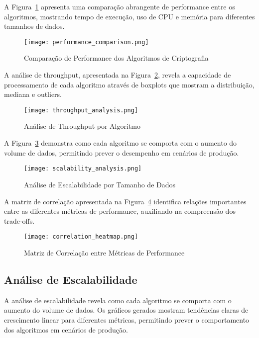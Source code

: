 \documentclass[12pt,a4paper,oneside]{article}
\begin{document}
A Figura~\ref{fig:performance} apresenta uma comparação abrangente de performance entre os algoritmos, mostrando tempo de execução, uso de CPU e memória para diferentes tamanhos de dados.

\begin{figure}[H]
\centering
\texttt{[image: performance\_comparison.png]}
\caption{Comparação de Performance dos Algoritmos de Criptografia}
\label{fig:performance}
\end{figure}

A análise de throughput, apresentada na Figura~\ref{fig:throughput}, revela a capacidade de processamento de cada algoritmo através de boxplots que mostram a distribuição, mediana e outliers.

\begin{figure}[H]
\centering
\texttt{[image: throughput\_analysis.png]}
\caption{Análise de Throughput por Algoritmo}
\label{fig:throughput}
\end{figure}

A Figura~\ref{fig:scalability} demonstra como cada algoritmo se comporta com o aumento do volume de dados, permitindo prever o desempenho em cenários de produção.

\begin{figure}[H]
\centering
\texttt{[image: scalability\_analysis.png]}
\caption{Análise de Escalabilidade por Tamanho de Dados}
\label{fig:scalability}
\end{figure}

A matriz de correlação apresentada na Figura~\ref{fig:correlation} identifica relações importantes entre as diferentes métricas de performance, auxiliando na compreensão dos trade-offs.

\begin{figure}[H]
\centering
\texttt{[image: correlation\_heatmap.png]}
\caption{Matriz de Correlação entre Métricas de Performance}
\label{fig:correlation}
\end{figure}

\subsection{Análise de Escalabilidade}

A análise de escalabilidade revela como cada algoritmo se comporta com o aumento do volume de dados. Os gráficos gerados mostram tendências claras de crescimento linear para diferentes métricas, permitindo prever o comportamento dos algoritmos em cenários de produção.
\end{document}
